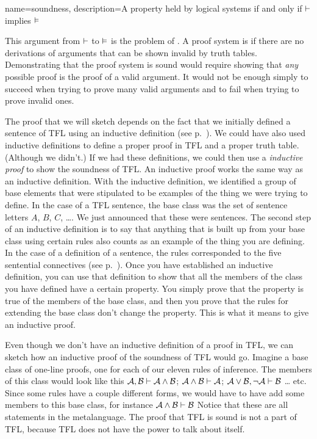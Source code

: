 {
name=soundness,
description={A property held by logical systems if and only if $\vdash $ implies $\vDash $}
}

This argument from $\vdash $ to $\vDash $ is the problem of . \label{def:soundness} A proof system is  if there are no derivations of arguments that can be shown invalid by truth tables. \label{def_Soundness} Demonstrating that the proof system is sound would require showing that \emph{any} possible proof is the proof of a valid argument. It would not be enough simply to succeed when trying to prove many valid arguments and to fail when trying to prove invalid ones.

The proof that we will sketch depends on the fact that we initially defined a sentence of TFL using an inductive definition (see p.~\pageref{TFLsentences}). We could have also used inductive definitions to define a proper proof in TFL and a proper truth table. (Although we didn't.) If we had these definitions, we could then use a \emph{inductive proof} to show the soundness of TFL. An inductive proof works the same way as an inductive definition. With the inductive definition, we identified a group of base elements that were stipulated to be examples of the thing we were trying to define. In the case of a TFL sentence, the base class was the set of sentence letters $A$, $B$, $C$, \dots. We just announced that these were sentences. The second step of an inductive definition is to say that anything that is built up from your base class using certain rules also counts as an example of the thing you are defining. In the case of a definition of a sentence, the rules corresponded to the five sentential connectives (see p.~\pageref{TFLsentences}). Once you have established an inductive definition, you can use that definition to show that all the members of the class you have defined have a certain property. You simply prove that the property is true of the members of the base class, and then you prove that the rules for extending the base class don't change the property. This is what it means to give an inductive proof.

Even though we don't have an inductive definition of a proof in TFL, we can sketch how an inductive proof of the soundness of TFL would go. Imagine a base class of one-line proofs, one for each of our eleven rules of inference. The members of this class would look like this $\mathcal{A}, \mathcal{B} \vdash  \mathcal{A} \wedge \mathcal{B}$; $\mathcal{A} \wedge \mathcal{B} \vdash \mathcal{A}$; $\mathcal{A} \vee \mathcal{B}, \neg\mathcal{A} \vdash  \mathcal{B}$ \ldots{} etc. Since some rules have a couple different forms, we would have to have add some members to this base class, for instance $\mathcal{A} \wedge \mathcal{B} \vdash  \mathcal{B}$ Notice that these are all statements in the metalanguage. The proof that TFL is sound is not a part of TFL, because TFL does not have the power to talk about itself. 

